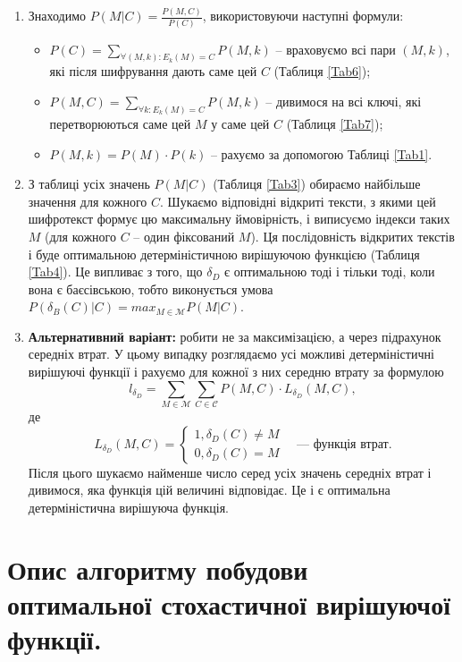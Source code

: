 \documentclass[a4paper,12pt]{article}
\newcommand{\altitem}[1]{\item[#1.]}
\begin{document}
\begin{enumerate}
  \item Знаходимо $P(M|C) = \frac{P(M,C)}{P(C)}$, використовуючи наступні формули:
  \begin{itemize}
  \item $P(C) = \sum_{\forall (M,k): E_{k}(M) = C}{P(M,k)}$ -- враховуємо всі пари $(M,k)$, які після шифрування дають саме цей $C$ (Таблиця \ref{Tab6});
  \item $P(M,C) = \sum_{\forall k: E_{k}(M) = C}{P(M,k)}$ -- дивимося на всі ключі, які перетворюються саме цей $M$ у саме цей $C$ (Таблиця \ref{Tab7});
  \item $P(M,k) = P(M) \cdot P(k)$ -- рахуємо за допомогою Таблиці \ref{Tab1}.
  \end{itemize}
  \item З таблиці усіх значень $P(M|C)$ (Таблиця \ref{Tab3}) обираємо найбільше значення для кожного $C$. Шукаємо відповідні відкриті тексти, з якими цей шифротекст формує цю максимальну ймовірність, і виписуємо індекси таких $M$ (для кожного $C$ -- один фіксований $M$).  Ця послідовність відкритих текстів і буде оптимальною детерміністичною вирішуючою функцією (Таблиця \ref{Tab4}). Це випливає з того, що $\delta_D$ є оптимальною тоді і тільки тоді, коли вона є баєсівською, тобто виконується умова $P(\delta_B(C)|C) = max_{M \in \mathcal{M}}P(M|C)$.
  \altitem{2*} \textbf{Альтернативний варіант:} робити не за максимізацією, а через підрахунок середніх втрат. У цьому випадку розглядаємо усі можливі детерміністичні вирішуючі функції і рахуємо для кожної з них середню втрату за формулою $$l_{\delta_D} = \sum_{M \in \mathcal{M}} \sum_{C \in \mathcal{C}}{P(M,C) \cdot L_{\delta_D}(M,C)},$$ де 
\begin{equation*}
 L_{\delta_D}(M,C) =      \left\{
                           \begin{array}{l}
                            1, \delta_D(C) \neq M \\
                            0, \delta_D(C) = M 
                            \end{array}
                          \right. \quad \text{— функція втрат.} \end{equation*} 
Після цього шукаємо найменше число серед усіх значень середніх втрат і дивимося, яка функція цій величині відповідає. Це і є оптимальна детерміністична вирішуюча функція. 
\end{enumerate}

\section{Опис алгоритму побудови оптимальної стохастичної вирішуючої функції.}
\end{document}
